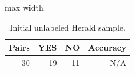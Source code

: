 \begin{table}[htbp]
\centering
\caption{Initial unlabeled Herald sample.}
\label{tab:initial-survey}
\small
\begin{adjustbox}{max width=\textwidth}
\begin{tabular}{rrrr}
\toprule
Pairs & YES & NO & Accuracy \\
\midrule
30 & 19 & 11 & N/A \\
\bottomrule
\end{tabular}
\end{adjustbox}
\end{table}
